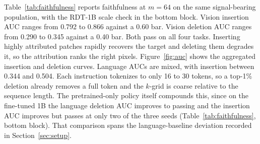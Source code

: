 \documentclass{article}
\begin{document}
Table~\ref{tab:faithfulness} reports faithfulness at $m{=}64$ on the same signal-bearing population, with the RDT-1B scale check in the bottom block.
Vision insertion AUC ranges from 0.792 to 0.866 against a 0.60 bar.
Vision deletion AUC ranges from 0.290 to 0.345 against a 0.40 bar.
Both pass on all four tasks.
Inserting highly attributed patches rapidly recovers the target and deleting them degrades it, so the attribution ranks the right pixels.
Figure~\ref{fig:auc} shows the aggregated insertion and deletion curves.
Language AUCs are mixed, with insertion between 0.344 and 0.504.
Each instruction tokenizes to only 16 to 30 tokens, so a top-1\% deletion already removes a full token and the $k$-grid is coarse relative to the sequence length.
The pretrained-only policy itself compounds this, since on the fine-tuned 1B the language deletion AUC improves to passing and the insertion AUC improves but passes at only two of the three seeds (Table~\ref{tab:faithfulness}, bottom block).
That comparison spans the language-baseline deviation recorded in Section~\ref{sec:setup}.
\end{document}
